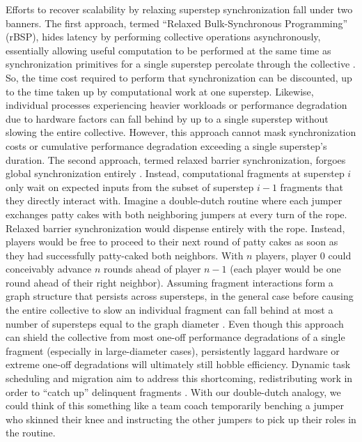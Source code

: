 Efforts to recover scalability by relaxing superstep synchronization fall under two banners.
The first approach, termed ``Relaxed Bulk-Synchronous Programming'' (rBSP), hides latency by performing collective operations asynchronously, essentially allowing useful computation to be performed at the same time as synchronization primitives for a single superstep percolate through the collective \citep{heroux2014toward}.
So, the time cost required to perform that synchronization can be discounted, up to the time taken up by computational work at one superstep.
Likewise, individual processes experiencing heavier workloads or performance degradation due to hardware factors can fall behind by up to a single superstep without slowing the entire collective.
However, this approach cannot mask synchronization costs or cumulative performance degradation exceeding a single superstep's duration.
The second approach, termed relaxed barrier synchronization, forgoes global synchronization entirely \citep{kim1998relaxed}.
Instead, computational fragments at superstep $i$ only wait on expected inputs from the subset of superstep $i-1$ fragments that they directly interact with.
Imagine a double-dutch routine where each jumper exchanges patty cakes with both neighboring jumpers at every turn of the rope.
Relaxed barrier synchronization would dispense entirely with the rope.
Instead, players would be free to proceed to their next round of patty cakes as soon as they had successfully patty-caked both neighbors.
With $n$ players, player 0 could conceivably advance $n$ rounds ahead of player $n-1$ (each player would be one round ahead of their right neighbor).
Assuming fragment interactions form a graph structure that persists across supersteps, in the general case before causing the entire collective to slow an individual fragment can fall behind at most a number of supersteps equal to the graph diameter \citep{gamell2015local}.
Even though this approach can shield the collective from most one-off performance degradations of a single fragment (especially in large-diameter cases), persistently laggard hardware or extreme one-off degradations will ultimately still hobble efficiency.
Dynamic task scheduling and migration aim to address this shortcoming, redistributing work in order to ``catch up'' delinquent fragments \citep{acun2014parallel}.
With our double-dutch analogy, we could think of this something like a team coach temporarily benching a jumper who skinned their knee and instructing the other jumpers to pick up their roles in the routine.

